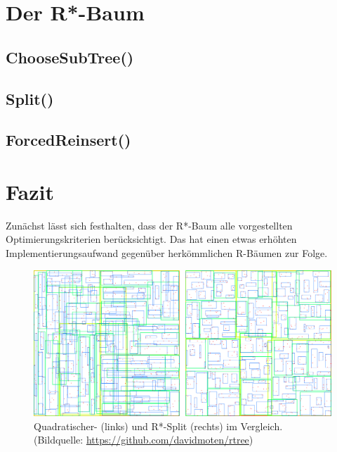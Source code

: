 \documentclass[runningheads,a4paper]{llncs}
\begin{document}


\section{Der R*-Baum} %
\label{sec:rstar_tree}

\subsection{ChooseSubTree()}

\subsection{Split()}

\subsection{ForcedReinsert()}
\label{sec:rstar_reinsert}


\section{Fazit} %
\label{sec:fazit}

	Zunächst lässt sich festhalten, dass der R*-Baum alle vorgestellten Optimierungskriterien berücksichtigt. Das hat einen etwas erhöhten Implementierungsaufwand gegenüber herkömmlichen R-Bäumen zur Folge.

	\begin{figure}[H]
		\centering
		\includegraphics[width=1\textwidth]{vergleich-quad-star.png}
		\caption{Quadratischer- (links) und R*-Split (rechts) im Vergleich. (Bildquelle: \url{https://github.com/davidmoten/rtree})}
		\label{fig:vergleich-quad-star}
	\end{figure}
\end{document}
